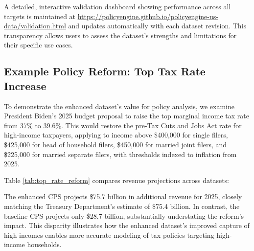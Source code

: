 A detailed, interactive validation dashboard showing performance across all targets is maintained at \url{https://policyengine.github.io/policyengine-us-data/validation.html} and updates automatically with each dataset revision. This transparency allows users to assess the dataset's strengths and limitations for their specific use cases.

\subsection{Example Policy Reform: Top Tax Rate Increase}

To demonstrate the enhanced dataset's value for policy analysis, we examine President Biden's 2025 budget proposal to raise the top marginal income tax rate from 37\% to 39.6\%. This would restore the pre-Tax Cuts and Jobs Act rate for high-income taxpayers, applying to income above \$400,000 for single filers, \$425,000 for head of household filers, \$450,000 for married joint filers, and \$225,000 for married separate filers, with thresholds indexed to inflation from 2025.



Table \ref{tab:top_rate_reform} compares revenue projections across datasets:


The enhanced CPS projects \$75.7 billion in additional revenue for 2025, closely matching the Treasury Department's estimate of \$75.4 billion. In contrast, the baseline CPS projects only \$28.7 billion, substantially understating the reform's impact. This disparity illustrates how the enhanced dataset's improved capture of high incomes enables more accurate modeling of tax policies targeting high-income households.
